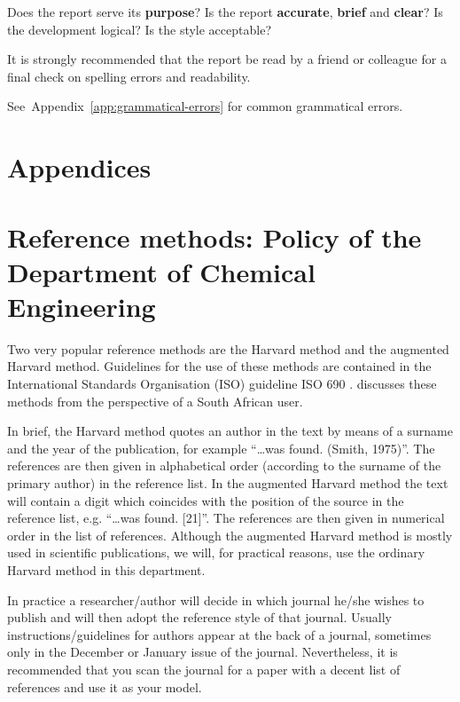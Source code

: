 \documentclass[a5paper, 10pt]{article}
\newcommand{\strongemph}[1]{\textbf{#1}}
\begin{document}
Does the report serve its \strongemph{purpose}?  Is the report
\strongemph{accurate}, \strongemph{brief} and \strongemph{clear}?  Is
the development logical?  Is the style acceptable?

It is strongly recommended that the report be read by a friend or
colleague for a final check on spelling errors and readability.

See~Appendix~\ref{app:grammatical-errors} for common grammatical errors.




\section{Appendices}
\appendix
\makeatletter
\def\@seccntformat#1{\csname Pref@#1\endcsname \csname the#1\endcsname\quad}
\def\Pref@section{Appendix~}
\makeatother

\section[Reference Methods: Policy of the Department of \\Chemical Engineering]{Reference methods: Policy of the \\Department of Chemical Engineering}
\label{app:reference_methods}
Two very popular reference methods are the Harvard method and the
augmented Harvard method.  Guidelines for the use of these methods are
contained in the International Standards Organisation (ISO) guideline
ISO 690 \citep{ISO690}.  \citet{burger} discusses these methods from
the perspective of a South African user.

In brief, the Harvard method quotes an author in the text by means of
a surname and the year of the publication, for example ``\dots was found.
(Smith, 1975)''.  The references are then given in alphabetical order
(according to the surname of the primary author) in the reference
list.  In the augmented Harvard method the text will contain a digit
which coincides with the position of the source in the reference list,
e.g. ``\dots was found.  [21]''.  The references are then given in
numerical order in the list of references.  Although the augmented
Harvard method is mostly used in scientific publications, we will, for
practical reasons, use the ordinary Harvard method in this department.

In practice a researcher/author will decide in which journal he/she
wishes to publish and will then adopt the reference style of that
journal.  Usually instructions/guidelines for authors appear at the
back of a journal, sometimes only in the December or January issue of
the journal.  Nevertheless, it is recommended that you scan the
journal for a paper with a decent list of references and use it as
your model.
\end{document}
